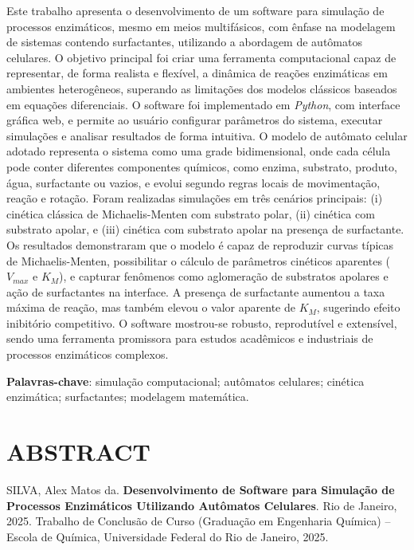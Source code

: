 \documentclass[12pt,oneside]{report}
\begin{document}
\medskip

Este trabalho apresenta o desenvolvimento de um software para simulação de processos enzimáticos, mesmo em meios multifásicos, com ênfase na modelagem de sistemas contendo surfactantes, utilizando a abordagem de autômatos celulares. O objetivo principal foi criar uma ferramenta computacional capaz de representar, de forma realista e flexível, a dinâmica de reações enzimáticas em ambientes heterogêneos, superando as limitações dos modelos clássicos baseados em equações diferenciais. O software foi implementado em \textit{Python}, com interface gráfica web, e permite ao usuário configurar parâmetros do sistema, executar simulações e analisar resultados de forma intuitiva. O modelo de autômato celular adotado representa o sistema como uma grade bidimensional, onde cada célula pode conter diferentes componentes químicos, como enzima, substrato, produto, água, surfactante ou vazios, e evolui segundo regras locais de movimentação, reação e rotação. Foram realizadas simulações em três cenários principais: (i) cinética clássica de Michaelis-Menten com substrato polar, (ii) cinética com substrato apolar, e (iii) cinética com substrato apolar na presença de surfactante. Os resultados demonstraram que o modelo é capaz de reproduzir curvas típicas de Michaelis-Menten, possibilitar o cálculo de parâmetros cinéticos aparentes ($V_{max}$ e $K_M$), e capturar fenômenos como aglomeração de substratos apolares e ação de surfactantes na interface. A presença de surfactante aumentou a taxa máxima de reação, mas também elevou o valor aparente de $K_M$, sugerindo efeito inibitório competitivo. O software mostrou-se robusto, reprodutível e extensível, sendo uma ferramenta promissora para estudos acadêmicos e industriais de processos enzimáticos complexos.

\medskip

\textbf{Palavras-chave}: simulação computacional; autômatos celulares; cinética enzimática; surfactantes; modelagem matemática.

\chapter*{\MakeUppercase{Abstract}}
SILVA, Alex Matos da. \textbf{Desenvolvimento de Software para Simulação de Processos Enzimáticos Utilizando Autômatos Celulares}. Rio de Janeiro, 2025. Trabalho de Conclusão de Curso (Graduação em Engenharia Química) – Escola de Química, Universidade Federal do Rio de Janeiro, 2025.
\end{document}
